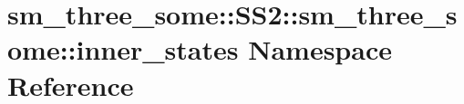 \hypertarget{namespacesm__three__some_1_1SS2_1_1sm__three__some_1_1inner__states}{}\section{sm\+\_\+three\+\_\+some\+:\+:S\+S2\+:\+:sm\+\_\+three\+\_\+some\+:\+:inner\+\_\+states Namespace Reference}
\label{namespacesm__three__some_1_1SS2_1_1sm__three__some_1_1inner__states}
